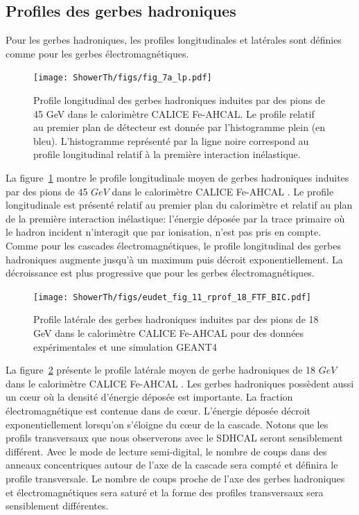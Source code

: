 \subsection{Profiles des gerbes hadroniques}
Pour les gerbes hadroniques, les profiles longitudinales et latérales sont définies comme pour les gerbes électromagnétiques. 
\begin{figure}[!h]
  \begin{center}
    \texttt{[image: ShowerTh/figs/fig\_7a\_lp.pdf]}
    \caption{Profile longitudinal des gerbes hadroniques induites par des pions de 45 GeV dans le calorimètre CALICE Fe-AHCAL. Le profile relatif au premier plan de détecteur est donnée par l'histogramme plein (en bleu). L'histogramme représenté par la ligne noire correspond au profile longitudinal relatif à la première interaction inélastique.}
    \label{fig:lProfile_pi-}
  \end{center}
\end{figure}
La figure~\ref{fig:lProfile_pi-} montre le profile longitudinale moyen de gerbes hadroniques induites par des pions de 45 $GeV$ dans le calorimètre CALICE Fe-AHCAL \cite{ahcal_pi-_profil}. Le profile longitudinale est présenté relatif au premier plan du calorimètre et relatif au plan de la première interaction inélastique: l'énergie déposée par la trace primaire où le hadron incident n'interagit que par ionisation, n'est pas pris en compte. Comme pour les cascades électromagnétiques, le profile longitudinal des gerbes hadroniques augmente jusqu'à un maximum puis décroit exponentiellement. La décroissance est plus progressive que pour les gerbes électromagnétiques. 

\begin{figure}[!h]
  \begin{center}
    \texttt{[image: ShowerTh/figs/eudet\_fig\_11\_rprof\_18\_FTF\_BIC.pdf]}
    \caption{Profile latérale des gerbes hadroniques induites par des pions de 18 GeV dans le calorimètre CALICE Fe-AHCAL pour des données expérimentales et une simulation GEANT4}
    \label{fig:tProfile_pi-}
  \end{center}
\end{figure}
La figure~\ref{fig:tProfile_pi-} présente le profile latérale moyen de gerbe hadroniques de 18 $GeV$ dans le calorimètre CALICE Fe-AHCAL \cite{ahcal_pi-_profil}. Les gerbes hadroniques possèdent aussi un cœur où la densité d'énergie déposée est importante. La fraction électromagnétique est contenue dans de cœur. L'énergie déposée décroit exponentiellement lorsqu'on s'éloigne du cœur de la cascade. Notons que les profils transversaux que nous observerons avec le SDHCAL seront sensiblement différent. Avec le mode de lecture semi-digital, le nombre de coups dans des anneaux concentriques autour de l'axe de la cascade sera compté et définira le profile transversale. Le nombre de coups proche de l'axe des gerbes hadroniques et électromagnétiques sera saturé et la forme des profiles transversaux sera sensiblement différentes.
